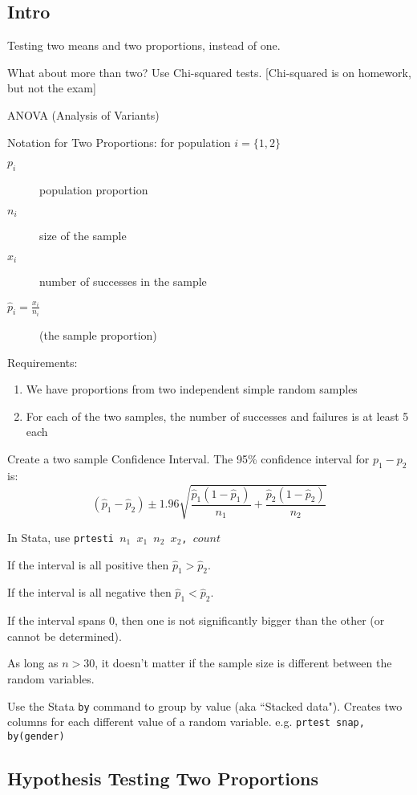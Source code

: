 \documentclass[11pt, oneside]{article}   	%
\begin{document}
\subsection{Intro}

Testing two means and two proportions, instead of one. 

What about more than two? Use Chi-squared tests. [Chi-squared is on homework, but not the exam]

ANOVA (Analysis of Variants) 


Notation for Two Proportions: for population $i = \{1, 2\}$
 \begin{description}
 \item [$p_i$]population proportion
 \item[$n_i$]size of the sample
 \item[$x_i$]number of successes in the sample
 \item[$\hat{p}_i = \frac{x_i}{n_i}$](the sample proportion)
 \end{description}

Requirements:
\begin{enumerate}
\item{We have proportions from two independent simple random samples}
\item{For each of the two samples, the number of successes and failures is at least 5 each}
\end{enumerate}
Create a two sample Confidence Interval. The 95\% confidence interval for $p_1-p_2$ is:
\[
(\hat{p}_1 - \hat{p}_2) \pm 1.96 \sqrt{\frac{\hat{p}_1(1-\hat{p}_1)}{n_1} + \frac{\hat{p}_2(1-\hat{p}_2)}{n_2}   }
\]

In Stata, use \texttt{prtesti $n_1$ $x_1$ $n_2$ $x_2$, $count$}

If the interval is all positive then $\hat{p}_1 > \hat{p}_2$.

If the interval is all negative then $\hat{p}_1 < \hat{p}_2$.

If the interval spans 0, then one is not significantly bigger than the other (or cannot be determined). 

As long as $n > 30$, it doesn't matter if the sample size is different between the random variables.
 
 Use the Stata \texttt{by} command to group by value (aka ``Stacked data"). Creates two columns for each different value of a random variable. e.g. \texttt{prtest snap, by(gender)}

\subsection{Hypothesis Testing Two Proportions}
\end{document}
